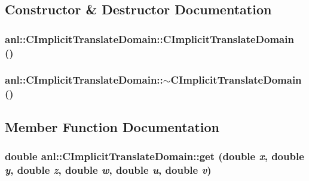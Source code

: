 \subsection{Constructor \& Destructor Documentation}
\hypertarget{classanl_1_1CImplicitTranslateDomain_a64f7f00d122cf708c20c54878aa184e1}{
\subsubsection[{CImplicitTranslateDomain}]{\setlength{\rightskip}{0pt plus 5cm}anl::CImplicitTranslateDomain::CImplicitTranslateDomain ()}}
\label{classanl_1_1CImplicitTranslateDomain_a64f7f00d122cf708c20c54878aa184e1}
\hypertarget{classanl_1_1CImplicitTranslateDomain_ae044feefa28a115068091303b7328d58}{
\subsubsection[{$\sim$CImplicitTranslateDomain}]{\setlength{\rightskip}{0pt plus 5cm}anl::CImplicitTranslateDomain::$\sim$CImplicitTranslateDomain ()}}
\label{classanl_1_1CImplicitTranslateDomain_ae044feefa28a115068091303b7328d58}


\subsection{Member Function Documentation}
\hypertarget{classanl_1_1CImplicitTranslateDomain_a7d92931fb9633a1831a7303ca433546d}{
\subsubsection[{get}]{\setlength{\rightskip}{0pt plus 5cm}double anl::CImplicitTranslateDomain::get (double {\em x}, \/  double {\em y}, \/  double {\em z}, \/  double {\em w}, \/  double {\em u}, \/  double {\em v})}}
\label{classanl_1_1CImplicitTranslateDomain_a7d92931fb9633a1831a7303ca433546d}


